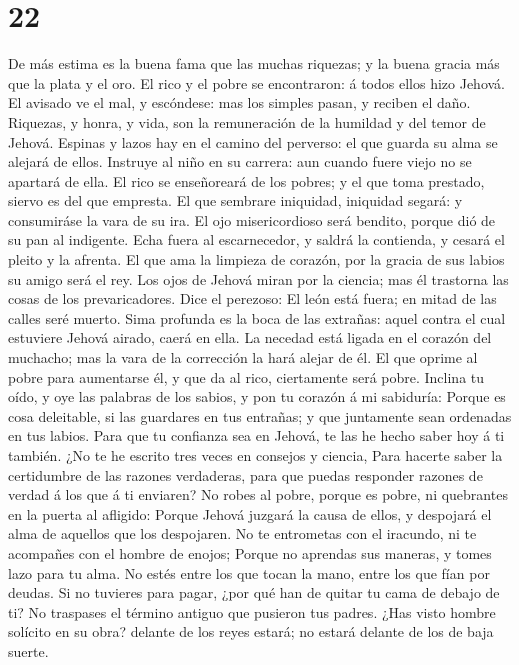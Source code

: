 \hypertarget{section-21}{%
\section{22}\label{section-21}}

 De más estima es la buena fama que las muchas riquezas; y
la buena gracia más que la plata y el oro.  El rico y el
pobre se encontraron: á todos ellos hizo Jehová.  El
avisado ve el mal, y escóndese: mas los simples pasan, y reciben el
daño.  Riquezas, y honra, y vida, son la remuneración de
la humildad y del temor de Jehová.  Espinas y lazos hay en
el camino del perverso: el que guarda su alma se alejará de ellos.
 Instruye al niño en su carrera: aun cuando fuere viejo no
se apartará de ella.  El rico se enseñoreará de los
pobres; y el que toma prestado, siervo es del que empresta.
 El que sembrare iniquidad, iniquidad segará: y
consumiráse la vara de su ira.  El ojo misericordioso será
bendito, porque dió de su pan al indigente.  Echa fuera
al escarnecedor, y saldrá la contienda, y cesará el pleito y la afrenta.
 El que ama la limpieza de corazón, por la gracia de sus
labios su amigo será el rey.  Los ojos de Jehová miran
por la ciencia; mas él trastorna las cosas de los prevaricadores.
 Dice el perezoso: El león está fuera; en mitad de las
calles seré muerto.  Sima profunda es la boca de las
extrañas: aquel contra el cual estuviere Jehová airado, caerá en ella.
 La necedad está ligada en el corazón del muchacho; mas
la vara de la corrección la hará alejar de él.  El que
oprime al pobre para aumentarse él, y que da al rico, ciertamente será
pobre.  Inclina tu oído, y oye las palabras de los
sabios, y pon tu corazón á mi sabiduría:  Porque es cosa
deleitable, si las guardares en tus entrañas; y que juntamente sean
ordenadas en tus labios.  Para que tu confianza sea en
Jehová, te las he hecho saber hoy á ti también.  ¿No te
he escrito tres veces en consejos y ciencia,  Para
hacerte saber la certidumbre de las razones verdaderas, para que puedas
responder razones de verdad á los que á ti enviaren?  No
robes al pobre, porque es pobre, ni quebrantes en la puerta al afligido:
 Porque Jehová juzgará la causa de ellos, y despojará el
alma de aquellos que los despojaren.  No te entrometas
con el iracundo, ni te acompañes con el hombre de enojos;
 Porque no aprendas sus maneras, y tomes lazo para tu
alma.  No estés entre los que tocan la mano, entre los
que fían por deudas.  Si no tuvieres para pagar, ¿por qué
han de quitar tu cama de debajo de ti?  No traspases el
término antiguo que pusieron tus padres.  ¿Has visto
hombre solícito en su obra? delante de los reyes estará; no estará
delante de los de baja suerte.

